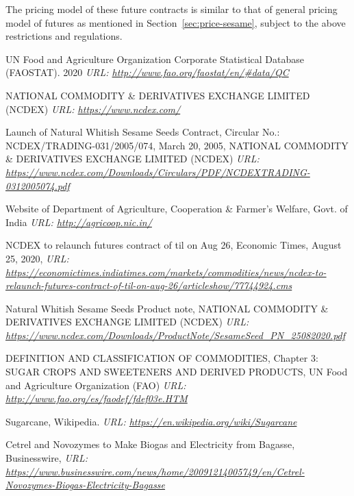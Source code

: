\documentclass[12pt]{report}
\begin{document}
The pricing model of these future contracts is similar to that of general pricing model of futures as mentioned in Section~\ref{sec:price-sesame}, subject to the above restrictions and regulations.


\begin{thebibliography}{9}

     UN Food and Agriculture Organization Corporate Statistical Database (FAOSTAT). 2020 \textit{URL: \url{http://www.fao.org/faostat/en/\#data/QC}}

     NATIONAL COMMODITY \& DERIVATIVES EXCHANGE LIMITED (NCDEX) \textit{URL: \url{https://www.ncdex.com/}} 

      Launch of Natural Whitish Sesame Seeds Contract, Circular No.: NCDEX/TRADING-031/2005/074, March 20, 2005, NATIONAL COMMODITY \& DERIVATIVES EXCHANGE LIMITED (NCDEX) \textit{URL: \url{https://www.ncdex.com/Downloads/Circulars/PDF/NCDEXTRADING-0312005074.pdf}}

     Website of Department of Agriculture, Cooperation \& Farmer's Welfare, Govt. of India \textit{URL: \url{http://agricoop.nic.in/}}

     NCDEX to relaunch futures contract of til on Aug 26, Economic Times, August 25, 2020, \textit{URL: \url{https://economictimes.indiatimes.com/markets/commodities/news/ncdex-to-relaunch-futures-contract-of-til-on-aug-26/articleshow/77744924.cms}}

     Natural Whitish Sesame Seeds Product note, NATIONAL COMMODITY \& DERIVATIVES EXCHANGE LIMITED (NCDEX) \textit{URL: \url{https://www.ncdex.com/Downloads/ProductNote/SesameSeed_PN_25082020.pdf}}

     DEFINITION AND CLASSIFICATION OF COMMODITIES, Chapter 3: SUGAR CROPS AND SWEETENERS AND DERIVED PRODUCTS, UN Food and Agriculture Organization (FAO) \textit{URL: \url{http://www.fao.org/es/faodef/fdef03e.HTM}}

     Sugarcane, Wikipedia. \textit{URL: \url{https://en.wikipedia.org/wiki/Sugarcane}}

     Cetrel and Novozymes to Make Biogas and Electricity from Bagasse, Businesswire, \textit{URL: \url{https://www.businesswire.com/news/home/20091214005749/en/Cetrel-Novozymes-Biogas-Electricity-Bagasse}}

\end{thebibliography}
\end{document}
